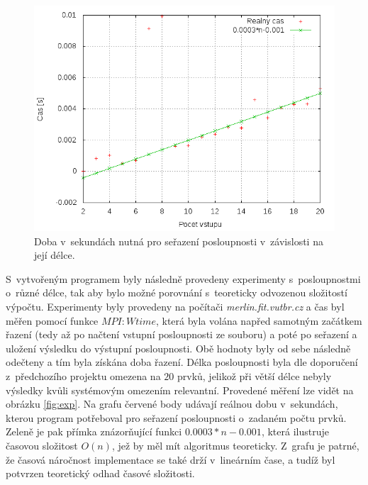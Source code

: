 \documentclass[a4paper, 12pt]{article}
\begin{document}
\begin{figure}[bt]
\begin{center}
\includegraphics[scale=0.8]{plots/perf.png}
\caption{Doba v~sekundách nutná pro seřazení posloupnosti v~závislosti na její délce.}
\end{center}
\end{figure}
\label{fig:exp}

S~vytvořeným programem byly následně provedeny experimenty s~posloupnostmi o~různé délce, tak aby bylo
možné porovnání s~teoreticky odvozenou složitostí výpočtu.
Experimenty byly provedeny na počítači \emph{merlin.fit.vutbr.cz} a čas byl měřen pomocí
funkce $MPI:Wtime$, která byla volána napřed samotným začátkem řazení (tedy až po načtení vstupní posloupnosti ze souboru)
a poté po seřazení a uložení výsledku do výstupní posloupnosti.
Obě hodnoty byly od sebe následně odečteny a tím byla získána doba řazení.
Délka posloupnosti byla dle doporučení z~předchozího projektu omezena na $20$ prvků, jelikož při
větší délce nebyly výsledky kvůli systémovým omezením relevantní.
Provedené měření lze vidět na obrázku \ref{fig:exp}.
Na grafu červené body udávají reálnou dobu v~sekundách, kterou program potřeboval pro seřazení
posloupnosti o~zadaném počtu prvků.
Zeleně je pak přímka znázorňující funkci $0.0003*n-0.001$, která ilustruje
časovou složitost $O(n)$, jež by měl mít algoritmus teoreticky.
Z~grafu je patrné, že časová náročnost implementace se také drží v~lineárním čase,
a tudíž byl potvrzen teoretický odhad časové složitosti.
\end{document}
